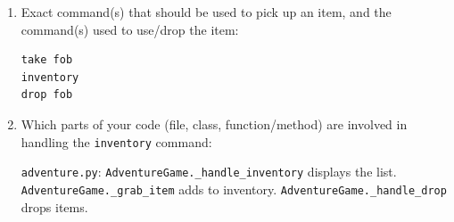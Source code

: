 \documentclass[11pt]{article}
\begin{document}
\begin{enumerate}
\begin{enumerate}
        \item For Item 5 (Lucky Mug):
        \begin{itemize}
            \item Item name: lucky mug
            \item Item start location ID: 5
            \item Item target location ID: 4
        \end{itemize}
        
        \item For Item 6 (T-Card):
        \begin{itemize}
            \item Item name: tcard
            \item Item start location ID: 6
            \item Item target location ID: 3
        \end{itemize}
        
        \item For Item 7 (Wallet):
        \begin{itemize}
            \item Item name: wallet
            \item Item start location ID: 7
            \item Item target location ID: 6
        \end{itemize}
    \end{enumerate}
    
    \item Exact command(s) that should be used to pick up an item, and the command(s) used to use/drop the item:
\begin{verbatim}
take fob
inventory
drop fob
\end{verbatim}
    
    \item Which parts of your code (file, class, function/method) are involved in handling the \texttt{inventory} command: 
    
    \texttt{adventure.py}: \texttt{AdventureGame.\_handle\_inventory} displays the list. \texttt{AdventureGame.\_grab\_item} adds to inventory. \texttt{AdventureGame.\_handle\_drop} drops items.
\end{enumerate}
\end{document}
